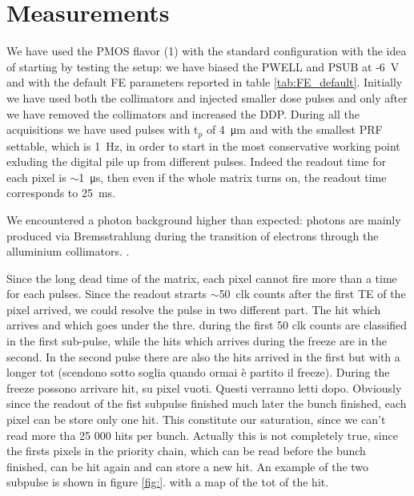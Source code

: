 \section{Measurements}
   We have used the PMOS flavor (1) with the standard configuration with the idea of starting by testing the setup: we have biased the PWELL and PSUB at -\SI{6}{V} and with the default FE parameters reported in table \ref{tab:FE_default}.
   Initially we have used both the collimators and injected smaller dose pulses and only after we have removed the collimators and increased the DDP. 
   During all the acquisitions we have used pulses with t$_p$ of \SI{4}{\um} and with the smallest PRF settable, which is \SI{1}{Hz}, in order to start in the most conservative working point exluding the digital pile up from different pulses. Indeed the readout time for each pixel is $\sim$\SI{1}{\us}, then even if the whole matrix turns on, the readout time corresponds to \SI{25}{ms}. 

   We encountered a photon background higher than expected: photons are mainly produced via Bremsstrahlung during the transition of electrons through the alluminium collimators.
   .

   Since the long dead time of the matrix, each pixel cannot fire more than a time for each pulses. 
   Since the readout strarts $\sim$\SI{50}{clk} counts after the first TE of the pixel arrived, we could resolve the pulse in two different part. 
   The hit which arrives and which goes under the thre. during the first 50 clk counts are classified in the first sub-pulse, while the hits which arrives during the freeze are in the second. In the second pulse there are also the hits arrived in the first but with a longer tot (scendono sotto soglia quando ormai è partito il freeze). 
   During the freeze possono arrivare hit, su pixel vuoti. Questi verranno letti dopo. 
   Obviously since the readout of the fist subpulse finished much later the bunch finished, each pixel can be store only one hit. 
   This constitute our saturation, since we can't read more tha 25 000 hits per bunch. 
   Actually this is not completely true, since the firsts pixels in the priority chain, which can be read before the bunch finished, can be hit again and can store a new hit. 
   An example of the two subpulse is shown in figure \ref{fig:}. with a map of the tot of the hit. 

